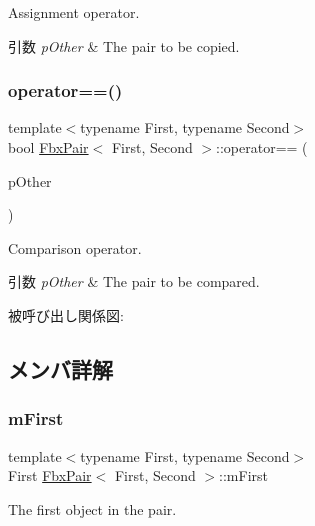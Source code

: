 Assignment operator. 
\begin{DoxyParams}{引数}
{\em p\+Other} & The pair to be copied. \\
\hline
\end{DoxyParams}
\mbox{\label{class_fbx_pair_a9ada9f26dbcfd8e26b4e6df741436824}} 
\subsubsection{\texorpdfstring{operator==()}{operator==()}}
{\footnotesize\ttfamily template$<$typename First, typename Second$>$ \\
bool \hyperlink{class_fbx_pair}{Fbx\+Pair}$<$ First, Second $>$\+::operator== (\begin{DoxyParamCaption}\item[{const \hyperlink{class_fbx_pair}{Fbx\+Pair}$<$ First, Second $>$ \&}]{p\+Other }\end{DoxyParamCaption})}

Comparison operator. 
\begin{DoxyParams}{引数}
{\em p\+Other} & The pair to be compared. \\
\hline
\end{DoxyParams}
被呼び出し関係図\+:


\subsection{メンバ詳解}
\mbox{\label{class_fbx_pair_ae4207e9014fead320362025388c70703}} 
\subsubsection{\texorpdfstring{m\+First}{mFirst}}
{\footnotesize\ttfamily template$<$typename First, typename Second$>$ \\
First \hyperlink{class_fbx_pair}{Fbx\+Pair}$<$ First, Second $>$\+::m\+First}



The first object in the pair. 

\mbox{\label{class_fbx_pair_ade45092061639a0a4256a0df59365d47}} 
